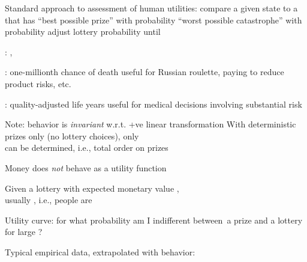\documentclass{article}
\begin{document}
\begin{huge}
Standard approach to assessment of human utilities:\al
  compare a given state  to a   that has\nl
    ``best possible prize'' \mat{$\ubest$} with probability \nl
    ``worst possible catastrophe'' \mat{$\uworst$} with probability \al
  adjust lottery probability  until 

\vspace*{0.4in}

\textwidth
{}


: , 

: one-millionth chance of death\al
  useful for Russian roulette, paying to reduce product risks, etc.

: quality-adjusted life years\al
  useful for medical decisions involving substantial risk

Note: behavior is \emph{invariant} w.r.t. +ve linear transformation
\mat{\[
  U'(x) = k_1 U(x) + k_2 \quad\mbox{where } k_1 > 0
\]}
With deterministic prizes only (no lottery choices), only\\
 can be determined, i.e., total order on prizes


Money does \emph{not} behave as a utility function

Given a lottery  with expected monetary value ,\\
usually , i.e., people are 

Utility curve: for what probability  am I indifferent between\
a prize  and a lottery  for large ?

Typical empirical data, extrapolated with  behavior:

\vspace*{0.2in}

\textwidth
{}



\heading{Student group utility}


\end{huge}
\end{document}
